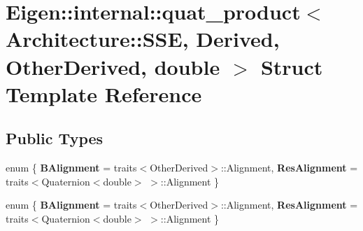 \hypertarget{struct_eigen_1_1internal_1_1quat__product_3_01_architecture_1_1_s_s_e_00_01_derived_00_01_other_derived_00_01double_01_4}{}\section{Eigen\+:\+:internal\+:\+:quat\+\_\+product$<$ Architecture\+:\+:S\+SE, Derived, Other\+Derived, double $>$ Struct Template Reference}
\label{struct_eigen_1_1internal_1_1quat__product_3_01_architecture_1_1_s_s_e_00_01_derived_00_01_other_derived_00_01double_01_4}
\subsection*{Public Types}
\begin{DoxyCompactItemize}
\item 
\mbox{\label{struct_eigen_1_1internal_1_1quat__product_3_01_architecture_1_1_s_s_e_00_01_derived_00_01_other_derived_00_01double_01_4_af4b8c40ef22cd066f19ee21836b0f542}} 
enum \{ {\bfseries B\+Alignment} = traits$<$Other\+Derived$>$\+:\+:Alignment, 
{\bfseries Res\+Alignment} = traits$<$Quaternion$<$double$>$ $>$\+:\+:Alignment
 \}
\item 
\mbox{\label{struct_eigen_1_1internal_1_1quat__product_3_01_architecture_1_1_s_s_e_00_01_derived_00_01_other_derived_00_01double_01_4_a60cc7a9806baf626598b723779c21fd1}} 
enum \{ {\bfseries B\+Alignment} = traits$<$Other\+Derived$>$\+:\+:Alignment, 
{\bfseries Res\+Alignment} = traits$<$Quaternion$<$double$>$ $>$\+:\+:Alignment
 \}
\end{DoxyCompactItemize}
